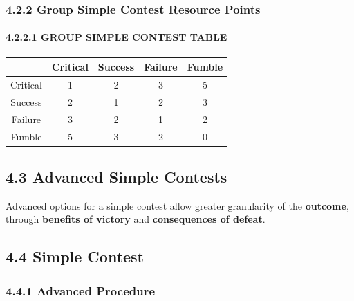\documentclass[
]{article}
\begin{document}
\hypertarget{group-simple-contest-resource-points}{%
\subsubsection{4.2.2 Group Simple Contest Resource
Points}\label{group-simple-contest-resource-points}}

\hypertarget{group-simple-contest-table}{%
\paragraph{4.2.2.1 GROUP SIMPLE CONTEST
TABLE}\label{group-simple-contest-table}}

\begin{longtable}[]{@{}ccccc@{}}
\toprule
& Critical & Success & Failure & Fumble\tabularnewline
\midrule
\endhead
Critical & 1 & 2 & 3 & 5\tabularnewline
Success & 2 & 1 & 2 & 3\tabularnewline
Failure & 3 & 2 & 1 & 2\tabularnewline
Fumble & 5 & 3 & 2 & 0\tabularnewline
\bottomrule
\end{longtable}

\hypertarget{advanced-simple-contests}{%
\subsection{4.3 Advanced Simple
Contests}\label{advanced-simple-contests}}

Advanced options for a simple contest allow greater granularity of the
\textbf{outcome}, through \textbf{benefits of victory} and
\textbf{consequences of defeat}.

\hypertarget{simple-contest-2}{%
\subsection{4.4 Simple Contest}\label{simple-contest-2}}

\hypertarget{advanced-procedure}{%
\subsubsection{4.4.1 Advanced Procedure}\label{advanced-procedure}}
\end{document}
